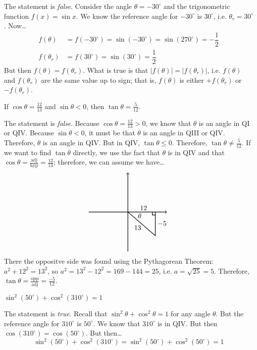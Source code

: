 \documentclass[11pt,letterpaper]{article}
\begin{document}
\sol The statement is \textit{false}. Consider the angle $\theta= -30^\circ$ and the trigonometric function $f(x)= \sin x$. We know the reference angle for $-30^\circ$ is $30^\circ$, i.e. $\theta_r= 30^\circ$. Now\dots
	\[
	\begin{aligned}
	f(\theta)&= f(-30^\circ)= \sin(-30^\circ)= \sin(270^\circ)= -\dfrac{1}{2} \\
	f(\theta_r)&= f(30^\circ)= \sin(30^\circ)= \dfrac{1}{2}
	\end{aligned}
	\]
But then $f(\theta)= f(\theta_r)$. What is true is that $|f(\theta)|= |f(\theta_r)|$, i.e. $f(\theta)$ and $f(\theta_r)$ are the same value up to sign; that is, $f(\theta)$ is either $+f(\theta_r)$ or $-f(\theta_r)$. \pvspace{1.3cm}



 If $\cos \theta= \frac{12}{13}$ and $\sin \theta < 0$, then $\tan \theta= \frac{5}{12}$. \pspace

\sol The statement is \textit{false}. Because $\cos \theta= \frac{12}{13} > 0$, we know that $\theta$ is an angle in QI or QIV. Because $\sin \theta < 0$, it must be that $\theta$ is an angle in QIII or QIV. Therefore, $\theta$ is an angle in QIV. But in QIV, $\tan \theta \leq 0$. Therefore, $\tan \theta \neq \frac{5}{12}$. If we want to find $\tan \theta$ directly, we use the fact that $\theta$ is in QIV and that $\cos \theta= \frac{\text{adj}}{\text{hyp}}= \frac{12}{13}$; therefore, we can assume we have\dots
	\[
	\begin{tikzpicture}
	\draw[line width=0.03cm,->] (-2,0) -- (2,0);				%
	\draw[line width=0.03cm,->] (0,-2) -- (0,2);				%
	
	\node at (0.6,-0.2) {$\theta$};
	\draw[line width=0.03cm] (0,0) -- (1.4,-1.2) -- (1.4,0);			%
	\draw[line width=0.03cm] (1.25,0) -- (1.25,-0.15) -- (1.4,-0.15);	%
	
	\node at (0.8,0.2) {$12$};
	\node at (1.75,-0.6) {$-5$};
	\node at (0.5,-0.8) {$13$};
	\end{tikzpicture}
	\]
There the oppositve side was found using the Pythagorean Theorem: $a^2 + 12^2= 13^2$, so $a^2= 13^2 - 12^2= 169 - 144= 25$, i.e. $a= \sqrt{25}= 5$. Therefore, $\tan \theta= \frac{\text{opp}}{\text{adj}}= \frac{-5}{12}$. \pvspace{1.3cm}



 $\sin^2(50^\circ) + \cos^2(310^\circ)= 1$ \pspace

\sol The statement is \textit{true}. Recall that $\sin^2 \theta + \cos^2 \theta= 1$ for any angle $\theta$. But the reference angle for $310^\circ$ is $50^\circ$. We know that $310^\circ$ is in QIV. But then $\cos(310^\circ)= \cos(50^\circ)$. But then\dots
	\[
	\sin^2(50^\circ) + \cos^2(310^\circ)= \sin^2(50^\circ) + \cos^2(50^\circ)= 1
	\]
\end{document}
